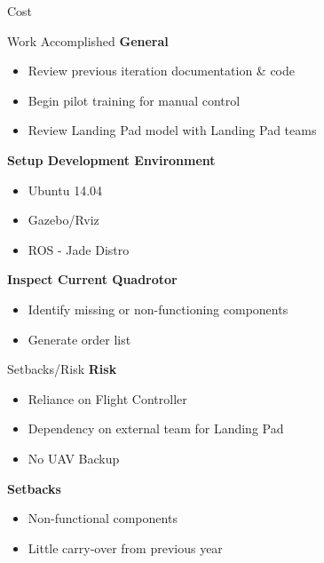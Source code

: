 \documentclass[11pt]{beamer}
\begin{document}
\begin{frame}{Cost}
\end{frame}

\begin{frame}{Work Accomplished}
\textbf{General}
\begin{itemize}
\item Review previous iteration documentation \& code
\item Begin pilot training for manual control
\item Review Landing Pad model with Landing Pad teams
\end{itemize}
\vspace{4mm}
\textbf{Setup Development Environment}
\begin{itemize}
\item Ubuntu 14.04
\item Gazebo/Rviz
\item ROS - Jade Distro
\end{itemize}
\vspace{4mm}
\textbf{Inspect Current Quadrotor}
\begin{itemize}
\item Identify missing or non-functioning components 
\item Generate order list
\end{itemize}
\end{frame}

\begin{frame}{Setbacks/Risk}
\textbf{Risk}
\begin{itemize}
\item Reliance on Flight Controller
\item Dependency on external team for Landing Pad
\item No UAV Backup
\end{itemize}
\vspace{6mm}
\textbf{Setbacks}
\begin{itemize}
\item Non-functional components
\item Little carry-over from previous year
\end{itemize}
\end{frame}
\end{document}

